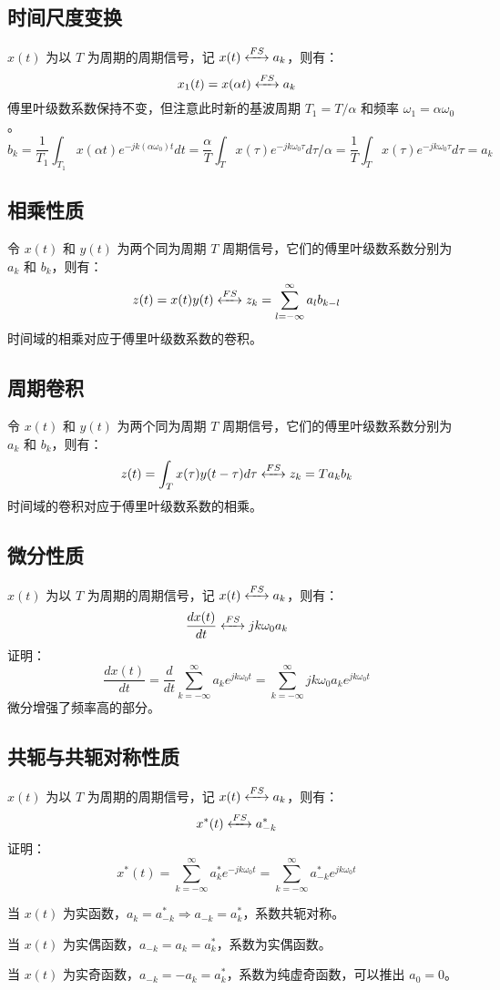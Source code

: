 \documentclass[UTF8]{report}
\theoremstyle{MyLineTheoremStyle} %
\theoremstyle{MyBlockTheoremStyle} %
\theoremstyle{MySubsubsectionStyle} %
\begin{document}
\subsection{时间尺度变换}
$x(t)$ 为以 $T$ 为周期的周期信号，记 $x(t) \xleftrightarrow{FS} a_k$，则有：
\[
x_1(t) = x(\alpha t) \xleftrightarrow{FS} a_k
\]
傅里叶级数系数保持不变，但注意此时新的基波周期 $T_1 = T/\alpha$ 和频率 $\omega_1 = \alpha \omega_0$。
\[
b_k = \frac{1}{T_1} \int_{T_1} x(\alpha t) e^{-jk(\alpha \omega_0)t} dt = \frac{\alpha}{T} \int_{T} x(\tau) e^{-jk\omega_0 \tau} d\tau/\alpha = \frac{1}{T} \int_{T} x(\tau) e^{-jk\omega_0 \tau} d\tau = a_k
\]

\subsection{相乘性质}
令 $x(t)$ 和 $y(t)$ 为两个同为周期 $T$ 周期信号，它们的傅里叶级数系数分别为 $a_k$ 和 $b_k$，则有：
\[
z(t) = x(t) y(t) \xleftrightarrow{FS} z_k = \sum_{l=-\infty}^{\infty} a_l b_{k-l}
\]
时间域的相乘对应于傅里叶级数系数的卷积。

\subsection{周期卷积}
令 $x(t)$ 和 $y(t)$ 为两个同为周期 $T$ 周期信号，它们的傅里叶级数系数分别为 $a_k$ 和 $b_k$，则有：
\[
z(t) = \int_{T} x(\tau) y(t - \tau) d\tau \xleftrightarrow{FS} z_k = T a_k b_k
\]
时间域的卷积对应于傅里叶级数系数的相乘。

\subsection{微分性质}
$x(t)$ 为以 $T$ 为周期的周期信号，记 $x(t) \xleftrightarrow{FS} a_k$，则有：
\[
\frac{d x(t)}{dt} \xleftrightarrow{FS} jk\omega_0 a_k
\]
证明：
\[
\frac{d x(t)}{dt} = \frac{d}{dt} \sum_{k=-\infty}^{\infty} a_k e^{jk\omega_0 t} = \sum_{k=-\infty}^{\infty} jk\omega_0 a_k e^{jk\omega_0 t}
\]
微分增强了频率高的部分。

\subsection{共轭与共轭对称性质}
$x(t)$ 为以 $T$ 为周期的周期信号，记 $x(t) \xleftrightarrow{FS} a_k$，则有：
\[
x^*(t) \xleftrightarrow{FS} a_{-k}^*
\]
证明：
\[
x^*(t) = \sum_{k=-\infty}^{\infty} a_k^* e^{-jk\omega_0 t} = \sum_{k=-\infty}^{\infty} a_{-k}^* e^{jk\omega_0 t}
\]\par
当 $x(t)$ 为实函数，$a_k = a_{-k}^* \Rightarrow a_{-k} = a_k^*$，系数共轭对称。\par
当 $x(t)$ 为实偶函数，$a_{-k} = a_k = a_k^*$，系数为实偶函数。\par
当 $x(t)$ 为实奇函数，$a_{-k} = -a_k = a_k^*$，系数为纯虚奇函数，可以推出 $a_0 = 0$。
\end{document}
